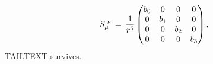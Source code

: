 \documentclass[12pt]{article}
\def\beq{\begin{eqnarray}}
\def\eeq{\end{eqnarray}}
\begin{document}
\beq
S_\mu^{\,\,\nu}
\,=\, \frac{1}{r^6}\,
\mqty( b_0 &0 &0 &0 \\ 0 &b_1 &0 &0
 \\ 0 &0 &b_2 &0 \\ 0 &0 &0 &b_3 ) \,,
\eeq
TAILTEXT survives.
\end{document}
